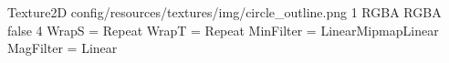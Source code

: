 Texture2D
config/resources/textures/img/circle_outline.png
1
RGBA
RGBA
false
4
WrapS = Repeat
WrapT = Repeat
MinFilter = LinearMipmapLinear
MagFilter = Linear
